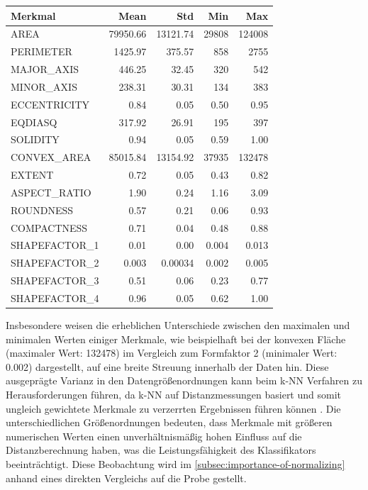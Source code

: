 {	
	\tiny
	\centering
	\begin{tabular}{lrrrr}
		\toprule
		{Merkmal} & {Mean} & {Std} & {Min} & {Max} \\
		\midrule
		AREA          & 79950.66 & 13121.74 & 29808 & 124008 \\
		PERIMETER     & 1425.97  & 375.57   & 858   & 2755 \\
		MAJOR\_AXIS    & 446.25   & 32.45    & 320   & 542 \\
		MINOR\_AXIS    & 238.31   & 30.31    & 134   & 383 \\
		ECCENTRICITY  & 0.84     & 0.05     & 0.50  & 0.95 \\
		EQDIASQ       & 317.92   & 26.91    & 195   & 397 \\
		SOLIDITY      & 0.94     & 0.05     & 0.59  & 1.00 \\
		CONVEX\_AREA   & 85015.84 & 13154.92 & 37935 & 132478 \\
		EXTENT        & 0.72     & 0.05     & 0.43  & 0.82 \\
		ASPECT\_RATIO  & 1.90     & 0.24     & 1.16  & 3.09 \\
		ROUNDNESS     & 0.57     & 0.21     & 0.06  & 0.93 \\
		COMPACTNESS   & 0.71     & 0.04     & 0.48  & 0.88 \\
		SHAPEFACTOR\_1 & 0.01     & 0.00     & 0.004 & 0.013 \\
		SHAPEFACTOR\_2 & 0.003    & 0.00034  & 0.002 & 0.005 \\
		SHAPEFACTOR\_3 & 0.51     & 0.06     & 0.23  & 0.77 \\
		SHAPEFACTOR\_4 & 0.96     & 0.05     & 0.62  & 1.00 \\
		\bottomrule
	\end{tabular}
	\label{tab:deskriptive_statistik}
}

Insbesondere weisen die erheblichen Unterschiede zwischen den maximalen und minimalen Werten einiger Merkmale, wie beispielhaft bei der konvexen Fläche (maximaler Wert: 132478) im Vergleich zum Formfaktor 2 (minimaler Wert: 0.002) dargestellt, auf eine breite Streuung innerhalb der Daten hin. Diese ausgeprägte Varianz in den Datengrößenordnungen kann beim k-NN Verfahren zu Herausforderungen führen, da k-NN auf Distanzmessungen basiert und somit ungleich gewichtete Merkmale zu verzerrten Ergebnissen führen können \cite{Lang.2023}. Die unterschiedlichen Größenordnungen bedeuten, dass Merkmale mit größeren numerischen Werten einen unverhältnismäßig hohen Einfluss auf die Distanzberechnung haben, was die Leistungsfähigkeit des Klassifikators beeinträchtigt.
Diese Beobachtung wird im \autoref{subsec:importance-of-normalizing} anhand eines direkten Vergleichs auf die Probe gestellt.

